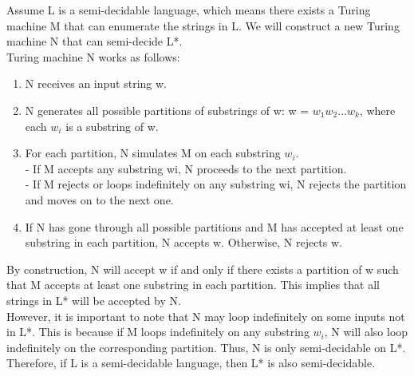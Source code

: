 Assume L is a semi-decidable language, which means there exists a Turing machine M that can enumerate the strings in L. We will construct a new Turing machine N that can semi-decide L*.\\

Turing machine N works as follows:
\begin{enumerate}
	\item N receives an input string w.
	\item N generates all possible partitions of substrings of w: w = $w_1w_2\dots w_k$, where each $w_i$ is a substring of w.
	\item For each partition, N simulates M on each substring $w_i$.\\
   - If M accepts any substring wi, N proceeds to the next partition.\\
   - If M rejects or loops indefinitely on any substring wi, N rejects the partition and moves on to the next one.\\
	\item If N has gone through all possible partitions and M has accepted at least one substring in each partition, N accepts w. Otherwise, N rejects w.


\end{enumerate}
By construction, N will accept w if and only if there exists a partition of w such that M accepts at least one substring in each partition. This implies that all strings in L* will be accepted by N.\\

However, it is important to note that N may loop indefinitely on some inputs not in L*. This is because if M loops indefinitely on any substring $w_i$, N will also loop indefinitely on the corresponding partition. Thus, N is only semi-decidable on L*.\\

Therefore, if L is a semi-decidable language, then L* is also semi-decidable.\\